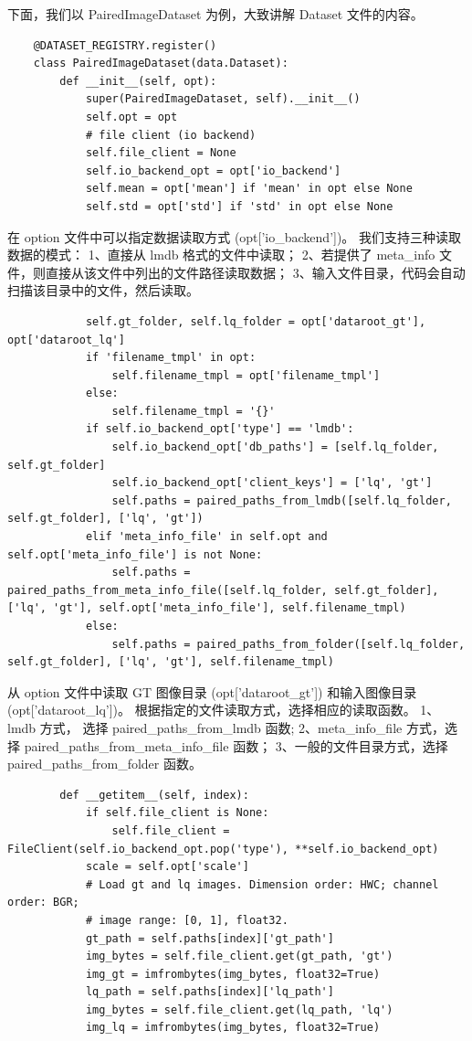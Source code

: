 \documentclass[../main.tex]{subfiles}
\begin{document}
    下面，我们以 PairedImageDataset 为例，大致讲解 Dataset 文件的内容。
    \begin{verbatim}
    @DATASET_REGISTRY.register()
    class PairedImageDataset(data.Dataset):
        def __init__(self, opt):
            super(PairedImageDataset, self).__init__()
            self.opt = opt
            # file client (io backend)
            self.file_client = None
            self.io_backend_opt = opt['io_backend']
            self.mean = opt['mean'] if 'mean' in opt else None
            self.std = opt['std'] if 'std' in opt else None
    \end{verbatim}
    在 option 文件中可以指定数据读取方式 (opt['io\_backend'])。
    我们支持三种读取数据的模式：
    1、直接从 lmdb 格式的文件中读取；
    2、若提供了 meta\_info 文件，则直接从该文件中列出的文件路径读取数据；
    3、输入文件目录，代码会自动扫描该目录中的文件，然后读取。
    \begin{verbatim}
            self.gt_folder, self.lq_folder = opt['dataroot_gt'], opt['dataroot_lq']
            if 'filename_tmpl' in opt:
                self.filename_tmpl = opt['filename_tmpl']
            else:
                self.filename_tmpl = '{}'
            if self.io_backend_opt['type'] == 'lmdb':
                self.io_backend_opt['db_paths'] = [self.lq_folder, self.gt_folder]
                self.io_backend_opt['client_keys'] = ['lq', 'gt']
                self.paths = paired_paths_from_lmdb([self.lq_folder, self.gt_folder], ['lq', 'gt'])
            elif 'meta_info_file' in self.opt and self.opt['meta_info_file'] is not None:
                self.paths = paired_paths_from_meta_info_file([self.lq_folder, self.gt_folder], ['lq', 'gt'], self.opt['meta_info_file'], self.filename_tmpl)
            else:
                self.paths = paired_paths_from_folder([self.lq_folder, self.gt_folder], ['lq', 'gt'], self.filename_tmpl)
    \end{verbatim}
    从 option 文件中读取 GT 图像目录 (opt['dataroot\_gt']) 和输入图像目录 (opt['dataroot\_lq'])。
    根据指定的文件读取方式，选择相应的读取函数。
    1、lmdb 方式， 选择 paired\_paths\_from\_lmdb 函数;
    2、meta\_info\_file 方式，选择 paired\_paths\_from\_meta\_info\_file 函数；
    3、一般的文件目录方式，选择 paired\_paths\_from\_folder 函数。
    \begin{verbatim}
        def __getitem__(self, index):
            if self.file_client is None:
                self.file_client = FileClient(self.io_backend_opt.pop('type'), **self.io_backend_opt)
            scale = self.opt['scale']
            # Load gt and lq images. Dimension order: HWC; channel order: BGR;
            # image range: [0, 1], float32.
            gt_path = self.paths[index]['gt_path']
            img_bytes = self.file_client.get(gt_path, 'gt')
            img_gt = imfrombytes(img_bytes, float32=True)
            lq_path = self.paths[index]['lq_path']
            img_bytes = self.file_client.get(lq_path, 'lq')
            img_lq = imfrombytes(img_bytes, float32=True)
    \end{verbatim}
\end{document}
